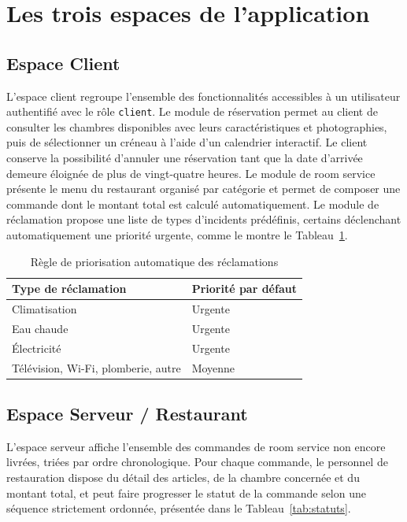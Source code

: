 \documentclass[12pt,a4paper]{report}
\begin{document}
\section{Les trois espaces de l'application}

\subsection{Espace Client}

L'espace client regroupe l'ensemble des fonctionnalités accessibles à un
utilisateur authentifié avec le rôle \texttt{client}. Le module de
réservation permet au client de consulter les chambres disponibles avec
leurs caractéristiques et photographies, puis de sélectionner un créneau à
l'aide d'un calendrier interactif. Le client conserve la possibilité
d'annuler une réservation tant que la date d'arrivée demeure éloignée de
plus de vingt-quatre heures. Le module de room service présente le menu
du restaurant organisé par catégorie et permet de composer une commande
dont le montant total est calculé automatiquement. Le module de
réclamation propose une liste de types d'incidents prédéfinis, certains
déclenchant automatiquement une priorité urgente, comme le montre le
Tableau~\ref{tab:priorite}.

\begin{table}[H]
\centering
\begin{tabular}{p{5cm} p{5cm}}
\toprule
\textbf{Type de réclamation} & \textbf{Priorité par défaut} \\
\midrule
Climatisation & Urgente \\
Eau chaude & Urgente \\
Électricité & Urgente \\
Télévision, Wi-Fi, plomberie, autre & Moyenne \\
\bottomrule
\end{tabular}
\caption{Règle de priorisation automatique des réclamations}
\label{tab:priorite}
\end{table}

\subsection{Espace Serveur / Restaurant}

L'espace serveur affiche l'ensemble des commandes de room service non
encore livrées, triées par ordre chronologique. Pour chaque commande, le
personnel de restauration dispose du détail des articles, de la chambre
concernée et du montant total, et peut faire progresser le statut de la
commande selon une séquence strictement ordonnée, présentée dans le
Tableau~\ref{tab:statuts}.
\end{document}

